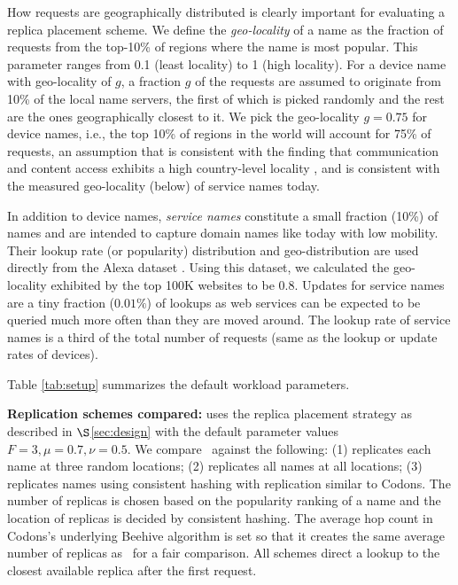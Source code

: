How requests are geographically distributed is clearly important for evaluating a replica placement scheme.  We define the {\em geo-locality} of a name as the fraction of requests from the top-10\% of regions where the name is most popular. This parameter ranges from 0.1 (least locality) to 1 (high locality). For a device name with  geo-locality of $g$,  a fraction $g$ of the requests are assumed to originate from 10\% of the local name servers, the first of which is picked randomly and the rest are the ones geographically closest to it. We pick the geo-locality $g=0.75$ for device names, i.e., the top 10\% of regions in the world will account for 75\% of requests, an assumption that is consistent with the finding that communication and content access exhibits a high country-level locality \cite{twitter-www}, and is consistent with the measured geo-locality (below) of service names today.

In addition to device names, {\em service names} constitute a small fraction (10\%) of names and are intended to capture domain names like today with low mobility. Their lookup rate (or popularity) distribution and geo-distribution are used directly from the Alexa dataset \cite{alexa}. Using this dataset, we calculated the geo-locality exhibited by the top 100K websites to be 0.8. Updates for service names are a tiny fraction ($0.01\%$) of lookups as web services can be expected to be queried much more often than they are moved around. The lookup rate of service names is a third of the total number of requests (same as the lookup or update rates of devices).

Table \ref{tab:setup} summarizes the default workload parameters.


{\textbf{Replication schemes compared:}}
\textbf{\auspice} uses the replica placement strategy as described in $\S$\ref{sec:design} with the default parameter values $F=3, \mu = 0.7, \nu = 0.5$. %
We compare \auspice\ against the following: (1) \textbf{\staticthree} replicates each name at three random locations; (2) \textbf{\replicateall} replicates all names at all locations; (3) \textbf{\codons} replicates names using consistent hashing with replication similar to Codons\cite{codons-paper}. The number of replicas is chosen based on the popularity ranking of a name and  the location of replicas is decided by consistent hashing. The average hop count in Codons's underlying Beehive algorithm  is set so that it creates the same average number of replicas as \auspice\ for a fair comparison. All schemes direct a lookup to the closest available replica after the first request.


